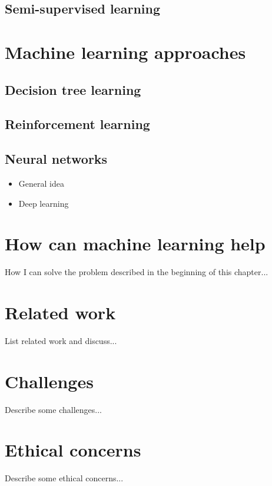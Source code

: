\subsection{Semi-supervised learning}

\newpage
\section{Machine learning approaches}
\subsection{Decision tree learning}
\subsection{Reinforcement learning}
\subsection{Neural networks}
\begin{itemize}
    \item General idea
    \item Deep learning
\end{itemize}

\newpage
\section{How can machine learning help}
How I can solve the problem described in the beginning of this chapter...

\newpage
\section{Related work}
List related work and discuss...

\newpage
\section{Challenges}
Describe some challenges...

\newpage
\section{Ethical concerns}
Describe some ethical concerns...
